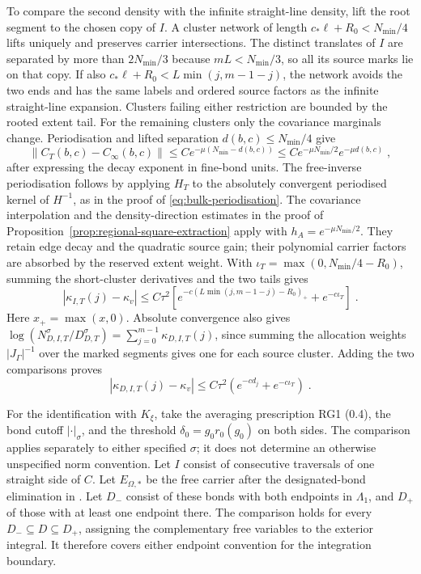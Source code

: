 \documentclass[11pt]{article}
\begin{document}
To compare the second density with the infinite straight-line density, lift the root segment to the chosen copy of $I$. A cluster network of length $c_*\ell+R_0<N_{\min}/4$ lifts uniquely and preserves carrier intersections. The distinct translates of $I$ are separated by more than $2N_{\min}/3$ because $mL<N_{\min}/3$, so all its source marks lie on that copy. If also $c_*\ell+R_0<L\min(j,m-1-j)$, the network avoids the two ends and has the same labels and ordered source factors as the infinite straight-line expansion. Clusters failing either restriction are bounded by the rooted extent tail. For the remaining clusters only the covariance marginals change. Periodisation and lifted separation $d(b,c)\leq N_{\min}/4$ give
\begin{equation}
    \|C_T(b,c)-C_\infty(b,c)\|
        \leq C e^{-\mu(N_{\min}-d(b,c))}
        \leq C e^{-\mu N_{\min}/2}e^{-\mu d(b,c)}\;,
\end{equation}
after expressing the decay exponent in fine-bond units. The free-inverse periodisation follows by applying $H_T$ to the absolutely convergent periodised kernel of $H^{-1}$, as in the proof of \eqref{eq:bulk-periodisation}. The covariance interpolation and the density-direction estimates in the proof of Proposition~\ref{prop:regional-square-extraction} apply with $h_A=e^{-\mu N_{\min}/2}$. They retain edge decay and the quadratic source gain; their polynomial carrier factors are absorbed by the reserved extent weight. With $\iota_T=\max(0,N_{\min}/4-R_0)$, summing the short-cluster derivatives and the two tails gives
\begin{equation}
    |\kappa_{I,T}(j)-\kappa_v|
        \leq C\tau^2\left[
            e^{-c(L\min(j,m-1-j)-R_0)_+}+e^{-c\iota_T}\right]\;.
\end{equation}
Here $x_+=\max(x,0)$. Absolute convergence also gives $\log(N_{D,I,T}^\sigma/D_{D,T}^\sigma)=\sum_{j=0}^{m-1}\kappa_{D,I,T}(j)$, since summing the allocation weights $|J_\Gamma|^{-1}$ over the marked segments gives one for each source cluster. Adding the two comparisons proves
\begin{equation}\label{eq:regional-torus-bound}
    |\kappa_{D,I,T}(j)-\kappa_v|
        \leq C\tau^2(e^{-cd_j}+e^{-c\iota_T})\;.
\end{equation}

For the identification with $K_\xi$, take the averaging prescription RG1 (0.4), the bond cutoff $|\cdot|_\sigma$, and the threshold $\delta_0=g_0r_0(g_0)$ on both sides. The comparison applies separately to either specified $\sigma$; it does not determine an otherwise unspecified norm convention. Let $I$ consist of consecutive traversals of one straight side of $C$. Let $E_{\Omega,*}$ be the free carrier after the designated-bond elimination in \cite[(1.14)--(1.15)]{BalabanCRE}. Let $D_-$ consist of these bonds with both endpoints in $\Lambda_1$, and $D_+$ of those with at least one endpoint there. The comparison holds for every $D_-\subseteq D\subseteq D_+$, assigning the complementary free variables to the exterior integral. It therefore covers either endpoint convention for the integration boundary.
\end{document}
